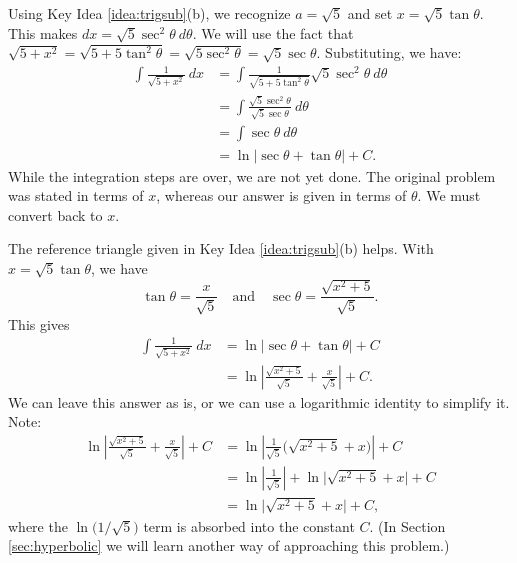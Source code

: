 {Using Key Idea \ref{idea:trigsub}(b), we recognize $a=\sqrt{5}$ and  set $x= \sqrt{5}\tan \theta$. This makes $dx = \sqrt{5}\sec^2\theta\ d\theta$. We will use the fact that $\sqrt{5+x^2} = \sqrt{5+5\tan^2\theta} = \sqrt{5\sec^2\theta} = \sqrt{5}\sec\theta.$ Substituting, we have:
\begin{align*}
\int \frac{1}{\sqrt{5+x^2}}\ dx &= \int \frac{1}{\sqrt{5+5\tan^2\theta}}\sqrt{5}\sec^2\theta\ d\theta \\
			&= \int \frac{\sqrt{5}\sec^2\theta}{\sqrt{5}\sec\theta} \ d\theta\\
			&= \int \sec\theta\ d\theta\\
			&= \ln\big|\sec\theta+\tan\theta\big|+C.
\end{align*}
While the integration steps are over, we are not yet done. The original problem was stated in terms of $x$, whereas our answer is given in terms of $\theta$. We must convert back to $x$.

The reference triangle given in Key Idea \ref{idea:trigsub}(b) helps. With $x=\sqrt{5}\tan\theta$, we have 
$$\tan \theta = \frac x{\sqrt{5}}\quad \text{and}\quad \sec\theta = \frac{\sqrt{x^2+5}}{\sqrt{5}}.$$
This gives
\begin{align*}
\int \frac{1}{\sqrt{5+x^2}}\ dx &= \ln\big|\sec\theta+\tan\theta\big|+C \\
     &= \ln\left|\frac{\sqrt{x^2+5}}{\sqrt{5}}+ \frac x{\sqrt{5}}\right|+C.
\end{align*}
We can leave this answer as is, or we can use a logarithmic identity to simplify it. Note:
\begin{align*}
\ln\left|\frac{\sqrt{x^2+5}}{\sqrt{5}}+ \frac x{\sqrt{5}}\right|+C &= \ln\left|\frac{1}{\sqrt{5}}\big(\sqrt{x^2+5}+ x\big)\right|+C \\
   &= \ln\left|\frac{1}{\sqrt{5}}\right| + \ln\big|\sqrt{x^2+5}+ x\big|+C\\
	&=	\ln\big|\sqrt{x^2+5}+ x\big|+C,
\end{align*}
where the $\ln\big(1/\sqrt{5}\big)$ term is absorbed into the constant $C$. (In Section \ref{sec:hyperbolic} we will learn another way of approaching this problem.)
}\\

